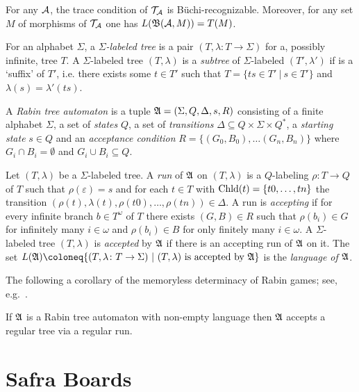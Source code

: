 \begin{proposition}\label{lem:bam}
  For any $\mathcal{A}$, the trace condition of $\mathcal{T}_{\mathcal{A}}$ is Büchi-recognizable.
  Moreover, for any set $M$ of morphisms of $\mathcal{T}_{\mathcal{A}}$ one has $L(\mathfrak{B}(\mathcal{A}, M)) = T(M)$.
\end{proposition}

For an alphabet $\Sigma$, a \emph{$\Sigma$-labeled tree} is a pair $(T,
\lambda \colon T \to \Sigma)$ for a, possibly infinite, tree $T$. A $\Sigma$-labeled
tree $(T, \lambda)$ is a \emph{subtree} of $\Sigma$-labeled $(T', \lambda')$ if
is a `suffix' of $T'$, i.e.
there exists some $t \in T'$ such that $T = \{ts \in T' ~|~ s \in T'\}$ and
$\lambda(s) = \lambda'(ts)$.

\begin{definition}
A \emph{Rabin tree automaton} is a tuple $\mathfrak{A} = (\Sigma, Q, \Delta, s, R)$ consisting
of a finite alphabet $\Sigma$, a set of \emph{states} $Q$, a set of \emph{transitions}
$\Delta \subseteq Q \times \Sigma \times Q^*$, a \emph{starting state} $s \in Q$ and an \emph{acceptance condition}
  $R = \{(G_0, B_0), \ldots (G_n, B_n)\}$ where $G_i \cap B_i = \emptyset$
  and $G_i \cup B_i \subseteq Q$.

Let $(T, \lambda)$ be a $\Sigma$-labeled tree. A \emph{run} of $\mathfrak{A}$ on $(T,
\lambda)$ is a $Q$-labeling $\rho \colon T \to Q$ of $T$ such that $\rho(\varepsilon)
= s$ and for each $t \in T$ with $\mathrm{Chld}(t) = \{t0, \ldots, tn\}$ the transition
$(\rho(t), \lambda(t), \rho(t0), \ldots, \rho(tn)) \in \Delta$. A run is
\emph{accepting} if for every infinite branch $b \in T^\omega$ of $T$ there
exists $(G, B) \in R$ such that $\rho(b_i) \in G$ for infinitely many $i \in
\omega$ and $\rho(b_i) \in B$ for only finitely many $i \in \omega$. A
$\Sigma$-labeled tree $(T, \lambda)$ is \emph{accepted} by $\mathfrak{A}$ if there is an
accepting run of $\mathfrak{A}$ on it. The set $L(\SA) \coloneq \{(T, \lambda \colon T \to
\Sigma) ~|~ (T, \lambda) \text{ is accepted by } \SA\}$ is the \emph{language of
$\mathfrak{A}$}.
\end{definition}

The following a corollary of the memoryless determinacy of Rabin games; see,
e.g.~\parencite{pitermanFasterSolutionsRabin2006}.
\begin{proposition}\label{lem:rabin-det}
  If $\mathfrak{A}$ is a Rabin tree automaton with non-empty language then
  \( \mathfrak{A} \) accepts a regular tree via a regular run.
\end{proposition}

\section{Safra Boards}
\label{sec:safra-boards}

